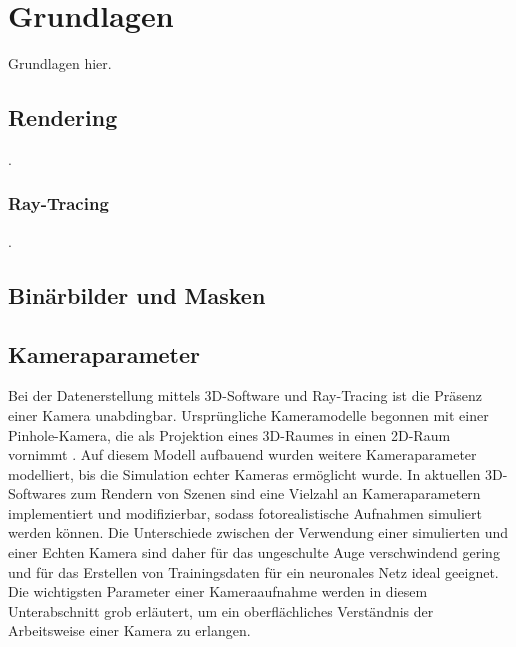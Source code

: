 
\section{Grundlagen}
\label{sec:daten:grundlagen}

Grundlagen hier.


\subsection{Rendering}
\label{sec:rendering}

.

\subsubsection{Ray-Tracing}
\label{sec:ray_tracing}

.



\subsection{Binärbilder und Masken}
\label{sec:masken}



\subsection{Kameraparameter}
\label{sec:kameras}

Bei der Datenerstellung mittels 3D-Software und Ray-Tracing ist die Präsenz einer Kamera unabdingbar. Ursprüngliche Kameramodelle begonnen mit einer Pinhole-Kamera, die als Projektion eines 3D-Raumes in einen 2D-Raum vornimmt \cite{pinhole_camera}. Auf diesem Modell aufbauend wurden weitere Kameraparameter modelliert, bis die Simulation echter Kameras ermöglicht wurde. In aktuellen 3D-Softwares zum Rendern von Szenen sind eine Vielzahl an Kameraparametern implementiert und modifizierbar, sodass fotorealistische Aufnahmen simuliert werden können. Die Unterschiede zwischen der Verwendung einer simulierten und einer Echten Kamera sind daher für das ungeschulte Auge verschwindend gering und für das Erstellen von Trainingsdaten für ein neuronales Netz ideal geeignet. Die wichtigsten Parameter einer Kameraaufnahme werden in diesem Unterabschnitt grob erläutert, um ein oberflächliches Verständnis der Arbeitsweise einer Kamera zu erlangen.


